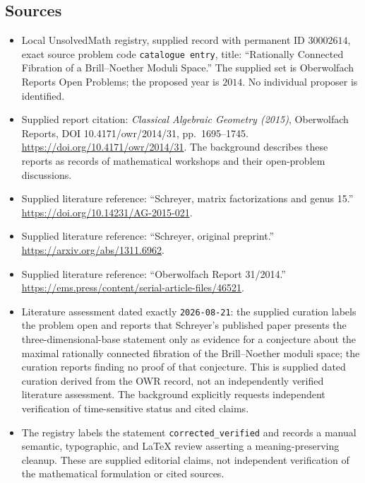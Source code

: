 \documentclass[11pt]{article}
\begin{document}
\subsection{Sources}
\begin{itemize}
\item Local UnsolvedMath registry, supplied record with permanent ID \(30002614\), exact source problem code \texttt{catalogue entry}, title: ``Rationally Connected Fibration of a Brill--Noether Moduli Space.'' The supplied set is Oberwolfach Reports Open Problems; the proposed year is \(2014\). No individual proposer is identified.
\item Supplied report citation: \emph{Classical Algebraic Geometry (2015)}, Oberwolfach Reports, DOI 10.4171/owr/2014/31, pp.\ 1695--1745. \url{https://doi.org/10.4171/owr/2014/31}. The background describes these reports as records of mathematical workshops and their open-problem discussions.
\item Supplied literature reference: ``Schreyer, matrix factorizations and genus 15.'' \url{https://doi.org/10.14231/AG-2015-021}.
\item Supplied literature reference: ``Schreyer, original preprint.'' \url{https://arxiv.org/abs/1311.6962}.
\item Supplied literature reference: ``Oberwolfach Report 31/2014.'' \url{https://ems.press/content/serial-article-files/46521}.
\item Literature assessment dated exactly \texttt{2026-08-21}: the supplied curation labels the problem open and reports that Schreyer's published paper presents the three-dimensional-base statement only as evidence for a conjecture about the maximal rationally connected fibration of the Brill--Noether moduli space; the curation reports finding no proof of that conjecture. This is supplied dated curation derived from the OWR record, not an independently verified literature assessment. The background explicitly requests independent verification of time-sensitive status and cited claims.
\item The registry labels the statement \texttt{corrected\_verified} and records a manual semantic, typographic, and LaTeX review asserting a meaning-preserving cleanup. These are supplied editorial claims, not independent verification of the mathematical formulation or cited sources.
\end{itemize}
\end{document}
